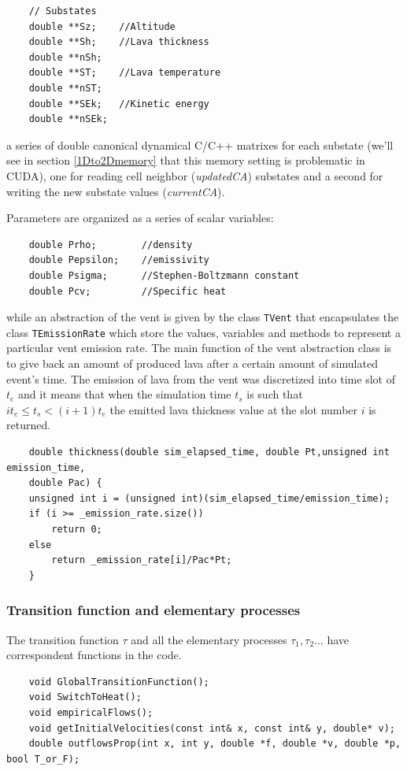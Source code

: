 \begin{lstlisting}
	// Substates
	double **Sz;	//Altitude
	double **Sh;	//Lava thickness
	double **nSh;
	double **ST;	//Lava temperature
	double **nST;
	double **SEk;	//Kinetic energy
	double **nSEk;
	\end{lstlisting}
a series of double canonical dynamical C/C++ matrixes for each
substate (we'll see in section \ref{1Dto2Dmemory}
that this memory setting is problematic in CUDA), one for reading cell neighbor
(\textit{updatedCA}) substates and a second for writing the new substate values
(\textit{currentCA}).

Parameters are organized as a series of scalar variables:

\begin{lstlisting}
	double Prho;		//density
	double Pepsilon;	//emissivity
	double Psigma;		//Stephen-Boltzmann constant
	double Pcv;			//Specific heat
\end{lstlisting}

while an abstraction of the vent is given by the class \texttt{TVent} that
encapsulates the class \texttt{TEmissionRate} which store the values, variables
and methods to represent a particular vent emission rate.
The main function of the vent abstraction class is to give back an amount of
produced lava after a certain amount of simulated event's time. The emission of
lava from the vent was discretized into time slot of \(t_e\) and it means that when the simulation time
\(t_s\) is such that \(i t_e \leq t_s < (i+1)  t_e \) the emitted lava thickness
value at the slot number \(i\) is returned.
\begin{lstlisting}
	double thickness(double sim_elapsed_time, double Pt,unsigned int emission_time,
	double Pac) { 
	unsigned int i = (unsigned int)(sim_elapsed_time/emission_time); 
	if (i >= _emission_rate.size())
		return 0;
	else
		return _emission_rate[i]/Pac*Pt;
	}
\end{lstlisting}


\subsubsection{Transition function and elementary processes}
The transition function \(\tau\) and all the elementary processes \(
\tau_1,\tau_2 \ldots \) have  correspondent functions in the code.
\begin{lstlisting}
	void GlobalTransitionFunction();
	void SwitchToHeat();
	void empiricalFlows();
	void getInitialVelocities(const int& x, const int& y, double* v);
	double outflowsProp(int x, int y, double *f, double *v, double *p, bool T_or_F);
\end{lstlisting}

